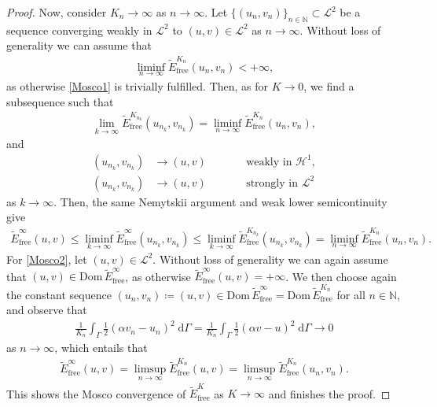 \documentclass[11pt,reqno]{amsart}
\theoremstyle{remark}
\numberwithin{equation}{section}
\newcommand{\N}{\mathbb N}
\newcommand{\intG}{\int_\Gamma}
\newcommand{\dG}{\;\mathrm d\Ga}
\newcommand{\Ga}{\Gamma}
\newcommand{\free}{\mathrm{free}}
\begin{document}
\begin{proof}
    Now, consider $K_n\rightarrow\infty$ as $n\rightarrow\infty$. Let $\{(u_n,v_n)\}_{n\in\N}\subset\mathcal{L}^2$ be a sequence converging weakly in $\mathcal{L}^2$ to $(u,v)\in\mathcal{L}^2$ as $n\rightarrow\infty$. Without loss of generality we can assume that 
    \begin{align*}
        \liminf_{n\rightarrow\infty} \widetilde E_\free^{K_n}(u_n,v_n) < + \infty,
    \end{align*}
    as otherwise \ref{Mosco1} is trivially fulfilled. Then, as for $K\rightarrow 0$, we find a subsequence such that
    \begin{align*}
        \lim_{k\rightarrow\infty} \widetilde E_\free^{K_{n_k}}(u_{n_k},v_{n_k}) = \liminf_{n\rightarrow\infty} \widetilde E_\free^{K_n}(u_n,v_n),
    \end{align*}
    and
    \begin{subequations}
        \begin{alignat}{2}
            (u_{n_k},v_{n_k}) &\rightarrow (u,v) &&\qquad\text{weakly in~}\mathcal{H}^1, \label{Prelim:Mosco:WeakConv:infty} \\
            (u_{n_k},v_{n_k}) &\rightarrow (u,v) &&\qquad \text{strongly in~}\mathcal{L}^2 \label{Prelim:Mosco:StrongConv:infty}
        \end{alignat}
    \end{subequations}
    as $k\rightarrow\infty$. Then, the same Nemytskii argument and weak lower semicontinuity give
    \begin{align*}
        \widetilde E_\free^\infty(u,v) \leq \liminf_{k\rightarrow\infty} \widetilde E_\free^\infty(u_{n_k},v_{n_k}) \leq \liminf_{k\rightarrow\infty} \widetilde E_\free^{K_{n_k}}(u_{n_k},v_{n_k}) = \liminf_{n\rightarrow\infty} \widetilde E_\free^{K_n}(u_n,v_n).
    \end{align*}
    For \ref{Mosco2}, let $(u,v)\in\mathcal{L}^2$. Without loss of generality we can again assume that $(u,v)\in\mathrm{Dom}\,\widetilde E_\free^\infty$, as otherwise $\widetilde E_\free^\infty(u,v) = +\infty$. We then choose again the constant sequence $(u_n,v_n)\coloneqq (u,v) \in\mathrm{Dom}\,\widetilde E_\free^\infty = \mathrm{Dom}\,\widetilde E_\free^{K_n}$ for all $n\in\N$, and observe that
    \begin{align*}
        \frac{1}{K_n}\intG \frac12(\alpha v_n - u_n)^2\dG = \frac{1}{K_n}\intG \frac12(\alpha v - u)^2\dG \rightarrow 0
    \end{align*}
    as $n\rightarrow\infty$, which entails that
    \begin{align*}
        \widetilde E_\free^\infty(u,v) = \limsup_{n\rightarrow\infty} \widetilde E_\free^{K_n}(u,v) = \limsup_{n\rightarrow\infty} \widetilde E_\free^{K_n}(u_n,v_n).
    \end{align*}
    This shows the Mosco convergence of $\widetilde E_\free^K$ as $K\rightarrow\infty$ and finishes the proof.
\end{proof}
\end{document}
